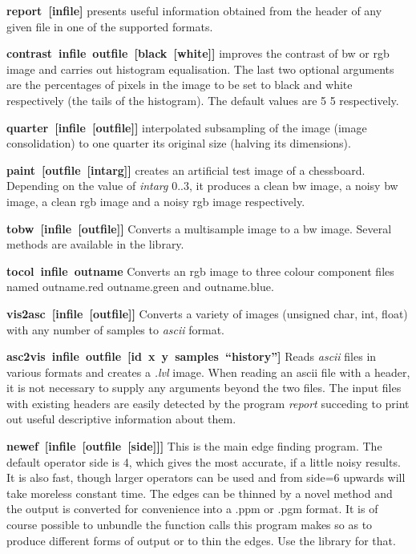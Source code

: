 \documentclass[11pt,twoside,english,a4paper]{article}
\begin{document}
\textbf{{report~{[}infile]}} presents useful information obtained from the
header of any given file in one of the supported formats.

\textbf{contrast~infile~outfile~{[}black~{[}white]]} improves
the contrast of bw or rgb image and carries out histogram equalisation.
The last two optional arguments are the percentages of pixels in the image to be set to black
and white respectively (the tails of the histogram).  The default values are 5 5 respectively.

\textbf{{quarter~{[}infile~{[}outfile]]}} interpolated subsampling of the image (image consolidation)
to one quarter its original size (halving its dimensions).

\textbf{{paint~[outfile~{[}intarg]]}} creates an artificial test image of a chessboard.
Depending on the value of \emph{intarg} 0..3, 
it produces a clean bw image, a noisy bw image, a clean rgb image and a noisy rgb image respectively. 

\textbf{{tobw~{[}infile~{[}outfile]]}} Converts a multisample image to a
bw image. Several methods are available in the library.

\textbf{{tocol~infile~outname}} Converts an rgb image to three colour
component files named outname.red outname.green and outname.blue.

\textbf{{vis2asc~{[}infile~{[}outfile]]}} Converts a variety of images
(unsigned char, int, float) with any number of samples to  \emph{ascii} format.

\textbf{{asc2vis~infile~outfile~{[}id~x~y~samples~``history'']}} Reads  \emph{ascii} 
files in various formats and creates a \emph{.lvl} image. 
When reading an ascii file with a header, it is not necessary to supply any arguments
beyond the two files. The input files with existing headers are easily detected by the program
\emph{report} succeding to print out useful descriptive information about them.

\textbf{newef~[infile~[outfile~[side]]]} This is the main edge finding program. 
The default operator side is 4, which gives the most accurate, 
if a little noisy results. It is also fast, though larger operators can be used
and from side=6 upwards will take moreless constant time. 
The edges can be thinned by a novel method and the output
is converted for convenience into a .ppm or .pgm format. 
It is of course possible to unbundle the function calls this program makes so as
to produce different forms of output or to thin the edges. Use the library for that.
\end{document}
